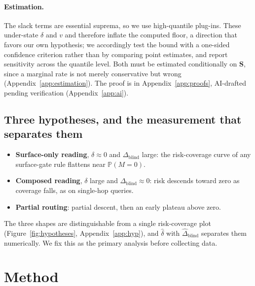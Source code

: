 \documentclass{article}
\newcommand{\gate}{\mathbf{S}}
\begin{document}
\paragraph{Estimation.} The slack terms are essential suprema, so we use high-quantile plug-ins.
These under-state $\delta$ and $v$ and therefore inflate the computed floor, a direction that favors
our own hypothesis; we accordingly test the bound with a one-sided confidence criterion rather than
by comparing point estimates, and report sensitivity across the quantile level. Both must be
estimated conditionally on $\gate$, since a marginal rate is not merely conservative but wrong
(Appendix~\ref{app:estimation}). The proof is in Appendix~\ref{app:proofs}, AI-drafted pending
verification (Appendix~\ref{app:ai}).

\subsection{Three hypotheses, and the measurement that separates them}
\label{sec:hypotheses}

\begin{itemize}
\itemsep0em
\item \textbf{Surface-only reading}, $\delta\approx0$ and $\Delta_{\mathrm{blind}}$
large: the risk-coverage curve of any surface-gate rule flattens near $\mathbb{P}(M=0)$.
\item \textbf{Composed reading}, $\delta$ large and $\Delta_{\mathrm{blind}}\approx0$:
risk descends toward zero as coverage falls, as on single-hop queries.
\item \textbf{Partial routing}: partial descent, then an early plateau above zero.
\end{itemize}

The three shapes are distinguishable from a single risk-coverage plot (Figure~\ref{fig:hypotheses}, Appendix~\ref{app:hyp}), and $\hat\delta$ with $\hat\Delta_{\mathrm{blind}}$ separates them
numerically. We fix this as the primary analysis before collecting data.


\section{Method}
\end{document}
